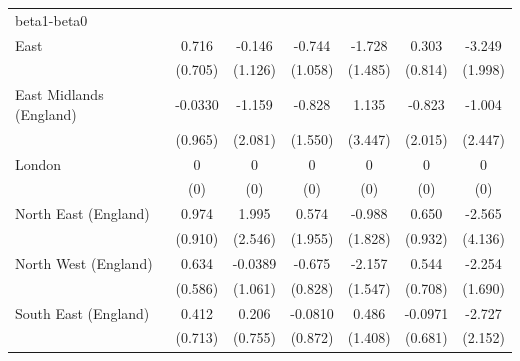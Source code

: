 \begin{table}[htbp]
\begin{tabular}{l*{6}{c}}
\midrule
beta1-beta0         &                     &                     &                     &                     &                     &                     \\
East                &       0.716         &      -0.146         &      -0.744         &      -1.728         &       0.303         &      -3.249         \\
                    &     (0.705)         &     (1.126)         &     (1.058)         &     (1.485)         &     (0.814)         &     (1.998)         \\
\addlinespace
East Midlands (England)&     -0.0330         &      -1.159         &      -0.828         &       1.135         &      -0.823         &      -1.004         \\
                    &     (0.965)         &     (2.081)         &     (1.550)         &     (3.447)         &     (2.015)         &     (2.447)         \\
\addlinespace
London              &           0         &           0         &           0         &           0         &           0         &           0         \\
                    &         (0)         &         (0)         &         (0)         &         (0)         &         (0)         &         (0)         \\
\addlinespace
North East (England)&       0.974         &       1.995         &       0.574         &      -0.988         &       0.650         &      -2.565         \\
                    &     (0.910)         &     (2.546)         &     (1.955)         &     (1.828)         &     (0.932)         &     (4.136)         \\
\addlinespace
North West (England)&       0.634         &     -0.0389         &      -0.675         &      -2.157         &       0.544         &      -2.254         \\
                    &     (0.586)         &     (1.061)         &     (0.828)         &     (1.547)         &     (0.708)         &     (1.690)         \\
\addlinespace
South East (England)&       0.412         &       0.206         &     -0.0810         &       0.486         &     -0.0971         &      -2.727         \\
                    &     (0.713)         &     (0.755)         &     (0.872)         &     (1.408)         &     (0.681)         &     (2.152)         \\

\end{tabular}
\end{table}

